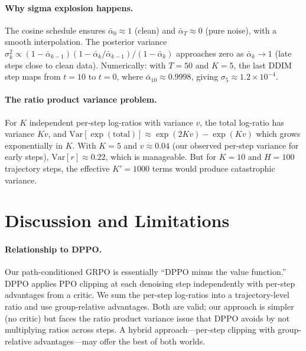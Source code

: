 \documentclass{article}
\begin{document}
\paragraph{Why sigma explosion happens.}
The cosine schedule ensures $\bar\alpha_0 \approx 1$ (clean) and $\bar\alpha_T \approx 0$ (pure noise), with a smooth interpolation.
The posterior variance $\sigma_k^2 \propto (1-\bar\alpha_{k-1})(1-\bar\alpha_k/\bar\alpha_{k-1}) / (1-\bar\alpha_k)$ approaches zero as $\bar\alpha_k \to 1$ (late steps close to clean data).
Numerically: with $T=50$ and $K=5$, the last DDIM step maps from $t=10$ to $t=0$, where $\bar\alpha_{10} \approx 0.9998$, giving $\sigma_5 \approx 1.2 \times 10^{-4}$.

\paragraph{The ratio product variance problem.}
For $K$ independent per-step log-ratios with variance $v$, the total log-ratio has variance $Kv$, and $\text{Var}[\exp(\text{total})] \approx \exp(2Kv) - \exp(Kv)$ which grows exponentially in $K$.
With $K=5$ and $v \approx 0.04$ (our observed per-step variance for early steps), $\text{Var}[r] \approx 0.22$, which is manageable.
But for $K=10$ and $H=100$ trajectory steps, the effective $K' = 1000$ terms would produce catastrophic variance.


\section{Discussion and Limitations}
\label{sec:discussion}

\paragraph{Relationship to DPPO.}
Our path-conditioned GRPO is essentially ``DPPO minus the value function.''
DPPO applies PPO clipping at each denoising step independently with per-step advantages from a critic.
We sum the per-step log-ratios into a trajectory-level ratio and use group-relative advantages.
Both are valid; our approach is simpler (no critic) but faces the ratio product variance issue that DPPO avoids by not multiplying ratios across steps.
A hybrid approach---per-step clipping with group-relative advantages---may offer the best of both worlds.
\end{document}
